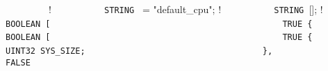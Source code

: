 {{%
\lstinline!        !\quad \quad{} {              ! \newline
\lstinline!          STRING ! = "default_cpu";    ! \newline
\lstinline!          STRING ![];             ! \newline
\lstinline!                                                     ! \newline
\lstinline!          BOOLEAN [                                  ! \newline
\lstinline!            TRUE {                                   ! \newline
\lstinline!              BOOLEAN [                              ! \newline
\lstinline!                TRUE {                               ! \newline
\lstinline!                  UINT32 SYS_SIZE;                   ! \newline
\lstinline!                },                                   ! \newline
\lstinline!                FALSE                                ! \newline
}}}
